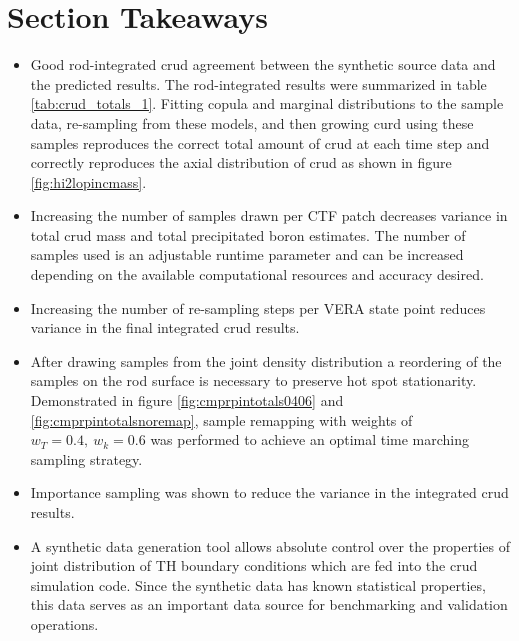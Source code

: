 \section{Section Takeaways}
\begin{itemize}
        \item  Good rod-integrated crud agreement between the synthetic source data and the predicted results.  The rod-integrated results were summarized in table \ref{tab:crud_totals_1}.  Fitting copula and marginal distributions to the sample data, re-sampling from these models, and then growing curd using these samples reproduces the correct total amount of crud at each time step and correctly reproduces the axial distribution of crud as shown in figure \ref{fig:hi2lopincmass}.
        \item Increasing the number of samples drawn per CTF patch decreases variance in total crud mass and total precipitated boron estimates.  The number of samples used is an adjustable runtime parameter and can be increased depending on the available computational resources and accuracy desired.
        \item Increasing the number of re-sampling steps per VERA state point reduces variance in the final integrated crud results. 
        \item After drawing samples from the joint density distribution a reordering of the samples on the rod surface is necessary to preserve hot spot stationarity.  Demonstrated in figure \ref{fig:cmprpintotals0406} and \ref{fig:cmprpintotalsnoremap}, sample remapping with weights of $w_T=0.4,\ w_k=0.6$ was performed to achieve an optimal time marching sampling strategy.
        \item Importance sampling was shown to reduce the variance in the integrated crud results.
        \item A synthetic data generation tool allows absolute control over the properties of joint distribution of TH boundary conditions which are fed into the crud simulation code.  Since the synthetic data has known statistical properties, this data serves as an important data source for benchmarking and validation operations.
\end{itemize}
